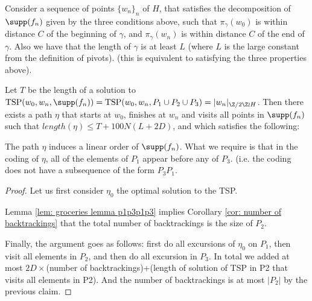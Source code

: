 \begin{lem}
    Consider a sequence of points $\{w_n\}_n$ of $H$, that satisfies the decomposition of $\supp(f_n)$ given by the three conditions above, such that $\pi_{\gamma}(w_0)$ is within distance $C$ of the beginning of $\gamma$, and $\pi_{\gamma}(w_n)$  is within distance $C$ of the end of $\gamma$. Also we have that the length of $\gamma$ is at least $L$ (where $L$ is the large constant from the definition of pivots). (this is equivalent to satisfying the three properties above).

  Let $T$ be the length of a solution to $\mathrm{TSP}(w_0,w_n,\supp(f_n))=\mathrm{TSP}(w_0,w_n,P_1\cup P_2\cup P_3)=|w_n|_{\Z/2\Z \wr H}$. Then there exists a path $\eta$ that starts at $w_0$, finishes at $w_n$ and visits all points in $\supp(f_n)$ such that $length(\eta)\le T+100 N (L+2D)$, and which satisfies the following:

  The path $\eta$ induces a linear order of $\supp(f_n)$. What we require is that in the coding of $\eta$, all of the elements of $P_1$ appear before any of $P_3$. (i.e. the coding does not have a subsequence of the form $P_3 P_1$.
\end{lem}
\begin{proof}

Let us first consider $\eta_0$ the optimal solution to the TSP. 


Lemma \ref{lem: groceries lemma p1p3p1p3} implies Corollary \ref{cor: number of backtrackings} that the total number of backtrackings is the size of $P_2$.

Finally, the argument goes as follows: first do all excursions of $\eta_0$ on $P_1$, then visit all elements in $P_2$, and then do all excursion in $P_3$. In total we added at most $2D\times$(number of backtrackings)+(length of solution of TSP in P2 that visits all elements in P2). And the number of backtrackings is at most $|P_2|$ by the previous claim.

\end{proof}
